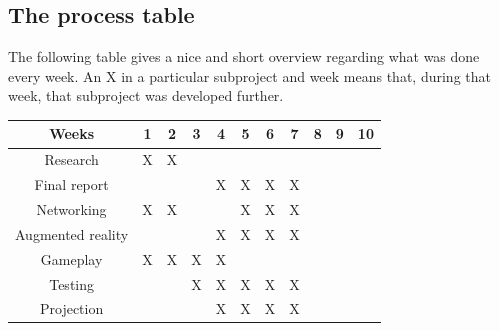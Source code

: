       \subsection{The process table} \label{ssec:processtable}
      The following table gives a nice and short overview regarding what was done
      every week. An X in a particular subproject and week means that, during that
      week, that subproject was developed further.\\
      \begin{table}[!ht]
	      \begin{tabular}{| c | c | c | c | c | c | c | c | c | c | c |}
	      	      \hline
	      	      Weeks & 1 & 2 & 3 & 4 & 5 & 6 & 7 & 8 & 9 & 10 \\
	      	      \hline
	      	      Research & X & X & \space & \space & \space & \space & \space & \space & \space & \space \\
	      	      \hline
	      	      Final report & \space & \space & \space & X & X & X & X & \space & \space & \space \\
	      	      \hline
	      	      Networking & X & X & \space & \space & X & X & X & \space & \space & \space \\
	      	      \hline
	      	      Augmented reality & \space & \space & \space & X & X & X & X & \space & \space & \space \\
	      	      \hline
	      	      Gameplay & X & X & X & X & \space & \space & \space & \space & \space & \space \\
	      	      \hline
	      	      Testing & \space & \space & X & X & X & X & X & \space & \space & \space \\
	      	      \hline
	      	      Projection & \space & \space & \space & X & X & X & X & \space & \space & \space \\
		      	  \hline
	      \end{tabular}
      \end{table}
